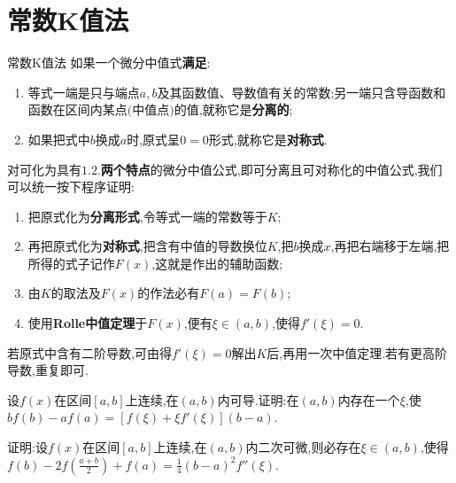 \chapter{常数K值法}

\begin{definition}{常数K值法}
	如果一个微分中值式\textbf{满足}:
	\begin{enumerate}
		\item 等式一端是只与端点$a,b$及其函数值、导数值有关的常数;另一端只含导函数和函数在区间内某点$($中值点$)$的值,就称它是\textbf{分离的};
		\item 如果把式中$b$换成$a$时,原式呈\textbf{$0=0$}形式,就称它是\textbf{对称式}.
	\end{enumerate}
	对可化为具有$1.2.$\textbf{两个特点}的微分中值公式,即可分离且可对称化的中值公式,我们可以统一按下程序证明:
	\begin{enumerate}
		\item 把原式化为\textbf{分离形式},令等式一端的常数等于$K$;
		\item 再把原式化为\textbf{对称式},把含有中值的导数换位$K$,把$b$换成$x$,再把右端移于左端,把所得的式子记作$F\left( x\right) $,这就是作出的辅助函数;
		\item 由$K$的取法及$F\left( x\right) $的作法必有$F\left( a\right) =F\left( b\right) $;
		\item 使用\textbf{Rolle中值定理}于$F\left( x\right) $,便有$\xi \in \left( a,b \right) $,使得$f'\left( \xi \right) =0$.
	\end{enumerate}
	若原式中含有二阶导数,可由得$f'\left( \xi \right) =0$解出$K$后,再用一次中值定理.若有更高阶导数,重复即可.
\end{definition}

\begin{example}
	设$f\left( x\right) $在区间$\left[ a,b\right] $上连续,在$\left( a,b\right) $内可导.证明:在$\left( a,b\right) $内存在一个$\xi $,使$bf\left( b \right) -af\left( a \right) =\left[ f\left( \xi \right) +\xi f'\left( \xi \right) \right] \left( b-a \right) $.
\end{example}

\vspace{8cm}

\begin{example}
	证明:设$f\left( x\right) $在区间$\left[ a,b\right] $上连续,在$\left( a,b\right) $内二次可微,则必存在$\xi \in \left( a,b \right) $,使得$f\left( b \right) -2f\left( \frac{a+b}{2} \right) +f\left( a \right) =\frac{1}{4}\left( b-a \right) ^2f''\left( \xi \right) $.
\end{example}

